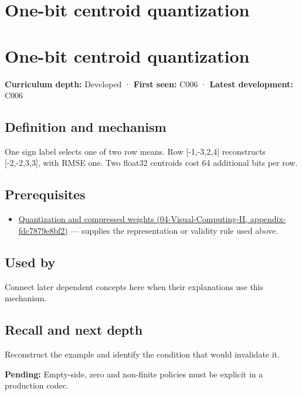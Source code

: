 \hypertarget{appendix-4ccd7a775813}{}
\section*{One-bit centroid quantization}
\section{One-bit centroid quantization}\label{one-bit-centroid-quantization}

\textbf{Curriculum depth:} Developed · \textbf{First seen:} C006 · \textbf{Latest development:} C006

\subsection{Definition and mechanism}\label{definition-and-mechanism}

One sign label selects one of two row means. Row {[}-1,-3,2,4{]} reconstructs {[}-2,-2,3,3{]}, with RMSE one. Two float32 centroids cost 64 additional bits per row.

\subsection{Prerequisites}\label{prerequisites}

\begin{itemize}
\tightlist
\item
  \href{}{Quantization and compressed weights (04-Visual-Computing-II, appendix-fdc7879e8bf2)} --- supplies the representation or validity rule used above.
\end{itemize}

\subsection{Used by}\label{used-by}

Connect later dependent concepts here when their explanations use this mechanism.

\subsection{Recall and next depth}\label{recall-and-next-depth}

Reconstruct the example and identify the condition that would invalidate it.

\textbf{Pending:} Empty-side, zero and non-finite policies must be explicit in a production codec.

